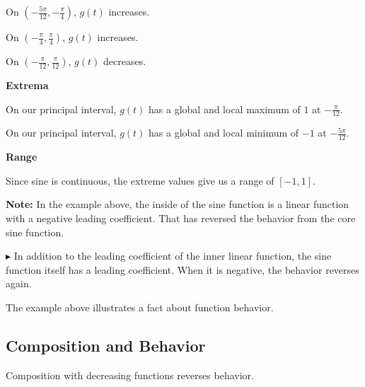 \documentclass{ximera}
\begin{document}
\begin{example}
On $\left( -\frac{5\pi}{12}, -\frac{\pi}{4} \right)$, $g(t)$ increases.

On $\left( -\frac{\pi}{4}, \frac{\pi}{4} \right)$, $g(t)$ increases.

On $\left( -\frac{\pi}{12}, \frac{\pi}{12} \right)$, $g(t)$ decreases.








\textbf{\textcolor{blue!55!black}{Extrema}} 


On our principal interval, $g(t)$ has a global and local maximum of $1$ at $-\frac{\pi}{12}$.


On our principal interval, $g(t)$ has a global and local minimum of $-1$ at $-\frac{5\pi}{12}$.





\textbf{\textcolor{blue!55!black}{Range}} 

Since sine is continuous, the extreme values give us a range of $[-1,1]$.


\end{example}





\textbf{Note:}  In the example above, the inside of the sine function is a linear function with a negative leading coefficient.  That has reversed the behavior from the core sine function.




\textbf{\textcolor{blue!55!black}{$\blacktriangleright$}} In addition to the leading coefficient of the inner linear function, the sine function itself has a leading coefficient.  When it is negative, the behavior reverses again.




The example above illustrates a fact about function behavior.



\subsection*{Composition and Behavior}

Composition with decreasing functions reverses behavior.
\end{document}
